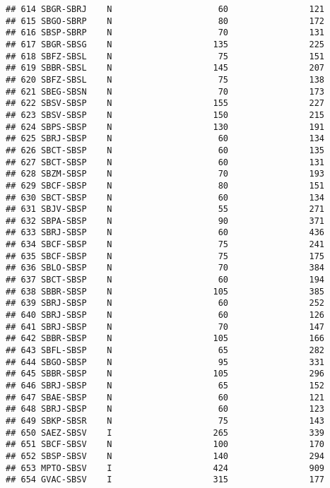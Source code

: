 \documentclass[
]{article}
\begin{document}
\begin{verbatim}
## 614 SBGR-SBRJ    N                     60                121
## 615 SBGO-SBRP    N                     80                172
## 616 SBSP-SBRP    N                     70                131
## 617 SBGR-SBSG    N                    135                225
## 618 SBFZ-SBSL    N                     75                151
## 619 SBBR-SBSL    N                    145                207
## 620 SBFZ-SBSL    N                     75                138
## 621 SBEG-SBSN    N                     70                173
## 622 SBSV-SBSP    N                    155                227
## 623 SBSV-SBSP    N                    150                215
## 624 SBPS-SBSP    N                    130                191
## 625 SBRJ-SBSP    N                     60                134
## 626 SBCT-SBSP    N                     60                135
## 627 SBCT-SBSP    N                     60                131
## 628 SBZM-SBSP    N                     70                193
## 629 SBCF-SBSP    N                     80                151
## 630 SBCT-SBSP    N                     60                134
## 631 SBJV-SBSP    N                     55                271
## 632 SBPA-SBSP    N                     90                371
## 633 SBRJ-SBSP    N                     60                436
## 634 SBCF-SBSP    N                     75                241
## 635 SBCF-SBSP    N                     75                175
## 636 SBLO-SBSP    N                     70                384
## 637 SBCT-SBSP    N                     60                194
## 638 SBBR-SBSP    N                    105                385
## 639 SBRJ-SBSP    N                     60                252
## 640 SBRJ-SBSP    N                     60                126
## 641 SBRJ-SBSP    N                     70                147
## 642 SBBR-SBSP    N                    105                166
## 643 SBFL-SBSP    N                     65                282
## 644 SBGO-SBSP    N                     95                331
## 645 SBBR-SBSP    N                    105                296
## 646 SBRJ-SBSP    N                     65                152
## 647 SBAE-SBSP    N                     60                121
## 648 SBRJ-SBSP    N                     60                123
## 649 SBKP-SBSR    N                     75                143
## 650 SAEZ-SBSV    I                    265                339
## 651 SBCF-SBSV    N                    100                170
## 652 SBSP-SBSV    N                    140                294
## 653 MPTO-SBSV    I                    424                909
## 654 GVAC-SBSV    I                    315                177

\end{verbatim}
\end{document}
